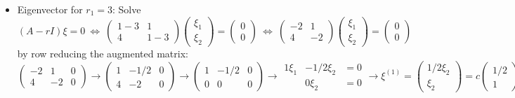 \documentclass[11pt,a4paper]{article}
\begin{document}
	\begin{itemize}
		\item Eigenvector for $r_1 = 3$: Solve
		$$
		(A-rI)\xi = 0\ \Leftrightarrow \ 
		\begin{pmatrix}
			1-3 & 1\\
			4 & 1-3
		\end{pmatrix}
		\begin{pmatrix}
			\xi_1\\
			\xi_2
		\end{pmatrix}
		=
		\begin{pmatrix}
			0\\
			0
		\end{pmatrix}\ \Leftrightarrow\ 
		\begin{pmatrix}
			-2 & 1\\
			4 & -2
		\end{pmatrix}
		\begin{pmatrix}
			\xi_1\\
			\xi_2
		\end{pmatrix}
		=
		\begin{pmatrix}
			0\\
			0
		\end{pmatrix}
		$$
		by row reducing the augmented matrix:\\
		$
		\begin{pmatrix}
			-2 & 1 & 0\\
			4 & -2 & 0
		\end{pmatrix}\to
		\begin{pmatrix}
			1 & -1/2 & 0\\
			4 & -2 & 0
		\end{pmatrix}\to
		\begin{pmatrix}
			1 & -1/2 & 0\\
			0 & 0 & 0
		\end{pmatrix}\to
		\begin{matrix}
			1\xi_1 & -1/2\xi_2 & = 0\\
			& 0\xi_2 & = 0
		\end{matrix}\to
		\xi^{(1)} =
		\begin{pmatrix}
			1/2\xi_2\\
			\xi_2
		\end{pmatrix}
		= c
		\begin{pmatrix}
			1/2\\
			1
		\end{pmatrix},\ c\ \text{arbitrary}\ \to \ \text{choose}\ \xi^{(1)} =
		\begin{pmatrix}
			1\\
			2
		\end{pmatrix}
		$
	\end{itemize}
\end{document}
